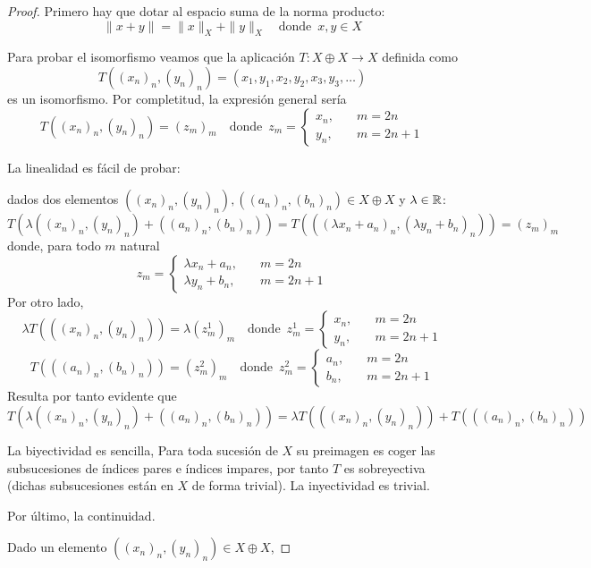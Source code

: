 				\begin{proof}
					Primero hay que dotar al espacio suma de la norma producto:
					\[\|x+ y\| = \|x\|_X + \|y\|_X \quad \text{donde }\, x,y \in X\]
					
					Para probar el isomorfismo veamos que la aplicación $T\colon X\oplus X \to X$ definida como 
					\[T((x_n)_n,(y_n)_n)  = (x_1, y_1,x_2,y_2,x_3,y_3,\dots)\]
					es un isomorfismo. Por completitud, la expresión general sería
					\[T((x_n)_n,(y_n)_n) = (z_m)_m \quad \text{donde }\, z_m = \left\{\begin{aligned} x_n, &\quad m = 2n \\ y_n, &\quad m = 2n+1\end{aligned}\right.\]
					
					La linealidad es fácil de probar: 
					
					dados dos elementos $((x_n)_n,(y_n)_n), ((a_n)_n,(b_n)_n) \in X\oplus X$ y $\lambda \in \mathbb{R}$:
					\[T(\lambda((x_n)_n,(y_n)_n) +  ((a_n)_n,(b_n)_n)) = T(((\lambda x_n+ a_n)_n,(\lambda y_n + b_n)_n)) = (z_m)_m\]
					donde, para todo $m$ natural
					\[z_m = \left\{\begin{aligned} \lambda x_n + a_n, &\quad m = 2n \\ \lambda y_n + b_n, &\quad m = 2n+1\end{aligned}\right. \]
					Por otro lado, 
					\[\lambda T(((x_n)_n,(y_n)_n))  = \lambda (z^1_m)_m \quad \text{donde }\, z_m^1 = \left\{\begin{aligned} x_n, &\quad m = 2n \\ y_n, &\quad m = 2n+1\end{aligned}\right. \]
					\[T(((a_n)_n,(b_n)_n)) = (z^2_m)_m \quad \text{donde }\, z^2_m = \left\{\begin{aligned} a_n, &\quad m = 2n \\ b_n, &\quad m = 2n+1\end{aligned}\right.\]
					Resulta por tanto evidente que 
					\[T(\lambda((x_n)_n,(y_n)_n) +  ((a_n)_n,(b_n)_n))  =\lambda T(((x_n)_n,(y_n)_n)) + T(((a_n)_n,(b_n)_n)) \]
					
					La biyectividad es sencilla, Para toda sucesión de $X$ su preimagen es coger las subsucesiones de índices pares e índices impares, por tanto $T$  es sobreyectiva (dichas subsucesiones están en $X$ de forma trivial). La inyectividad es trivial.
					
					Por último, la continuidad.
					
					Dado un elemento $((x_n)_n,(y_n)_n) \in X\oplus X$,
					

\end{proof}
